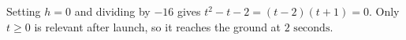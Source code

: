 Setting $h=0$ and dividing by $-16$ gives $t^2-t-2=(t-2)(t+1)=0$. Only $t\ge0$ is relevant after launch, so it reaches the ground at $\boxed{2\text{ seconds}}$.

